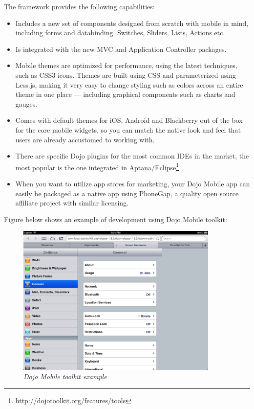 \documentclass[a4paper,12pt]{book}
\begin{document}
The framework provides the following capabilities:
\begin{itemize}
\item Includes a new set of components designed from scratch with mobile in mind, including forms and databinding. Switches, Sliders, Lists, Actions etc.
\item Is integrated with the new MVC and Application Controller packages.
\item Mobile themes are optimized for performance, using the latest techniques, such as CSS3 icons. Themes are built using CSS and parameterized using Less.js, making it very easy to change styling such as colors across an entire theme in one place — including graphical components such as charts and gauges.
\item Comes with default themes for iOS, Android and Blackberry out of the box for the core mobile widgets, so you can match the native look and feel that users are already accustomed to working with.
\item There are specific Dojo plugins for the most common IDEs in the market, the most popular is the one integrated in Aptana/Eclipse\footnote{http://dojotoolkit.org/features/tools} . 
\item When you want to utilize app stores for marketing, your Dojo Mobile app can easily be packaged as a native app using PhoneGap, a quality open source affiliate project with similar licensing.
\end{itemize}

Figure below shows an example of development using Dojo Mobile toolkit:

\begin{figure}[H]
    \centering
    \includegraphics[width=10cm, keepaspectratio]{img/dojo.png}
    \caption{\textit{Dojo Mobile toolkit example}}
 \end{figure}
\end{document}
